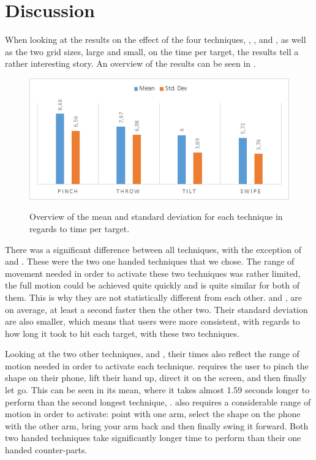 \section{Discussion}
\label{sec:discussion}

When looking at the results on the effect of the four techniques, \pinch, \tilt, \swipe and \throw, as well as the two grid sizes, large and small, on the time per target, the results tell a rather interesting story. An overview of the results can be seen in .

\begin{figure}[H]
	{\includegraphics[width = 1\columnwidth ]{images/timeResults.png}} 
	\caption{
		Overview of the mean and standard deviation for each technique in regards to time per target.
	}
	\label{fig:timeResults}
\end{figure}

There was a significant difference between all techniques, with the exception of \swipe and \tilt. These were the two one handed techniques that we chose. The range of movement needed in order to activate these two techniques was rather limited, the full motion could be achieved quite quickly and is quite similar for both of them.  This is why they are not statistically different from each other. \swipe and \tilt, are on average, at least a second faster then the other two. Their standard deviation are also smaller, which means that users were more consistent, with regards to how long it took to hit each target, with these two techniques. 

Looking at the two other techniques, \pinch and \throw, their times also reflect the range of motion needed in order to activate each technique. \pinch requires the user to pinch the shape on their phone, lift their hand up, direct it on the screen, and then finally let go. This can be seen in its mean, where it takes almost 1.59 seconds longer to perform than the second longest technique, \throw. \throw also requires a considerable range of motion in order to activate: point with one arm, select the shape on the phone with the other arm, bring your arm back and then finally swing it forward. Both two handed techniques take significantly longer time to perform than their one handed counter-parts.


